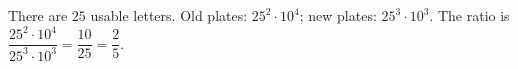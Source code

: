 There are $25$ usable letters. Old plates: $25^2\cdot10^4$; new plates: $25^3\cdot10^3$. The ratio is $\dfrac{25^2\cdot10^4}{25^3\cdot10^3}=\dfrac{10}{25}=\boxed{\dfrac{2}{5}}$.
